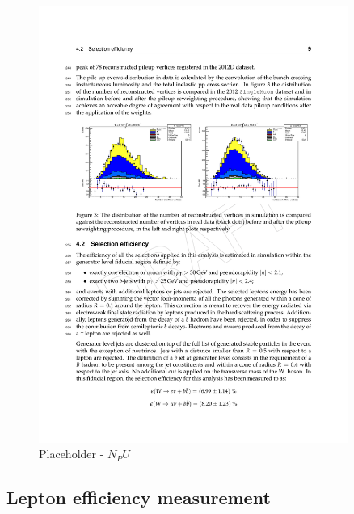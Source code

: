\begin{figure}[htbp]
	\centering
		\includegraphics[width=0.9\textwidth]{Figures/NPU_placeholder.pdf}
	\caption[Placeholder - PU]{Placeholder - $N_PU$}
	\label{fig:N_pu}
\end{figure} 

\subsection{Lepton efficiency measurement}

